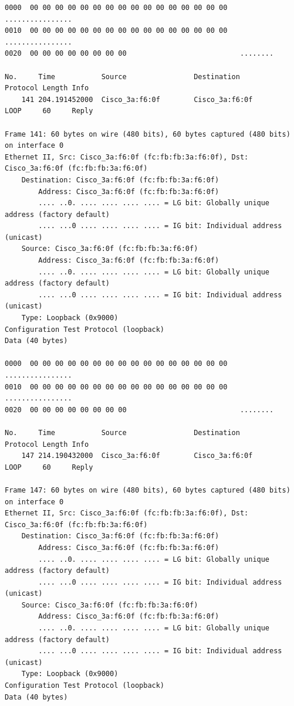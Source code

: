 \documentclass[a4paper,11pt]{article}
\begin{document}
\begin{lstlisting}
0000  00 00 00 00 00 00 00 00 00 00 00 00 00 00 00 00   ................
0010  00 00 00 00 00 00 00 00 00 00 00 00 00 00 00 00   ................
0020  00 00 00 00 00 00 00 00                           ........

No.     Time           Source                Destination           Protocol Length Info
    141 204.191452000  Cisco_3a:f6:0f        Cisco_3a:f6:0f        LOOP     60     Reply

Frame 141: 60 bytes on wire (480 bits), 60 bytes captured (480 bits) on interface 0
Ethernet II, Src: Cisco_3a:f6:0f (fc:fb:fb:3a:f6:0f), Dst: Cisco_3a:f6:0f (fc:fb:fb:3a:f6:0f)
    Destination: Cisco_3a:f6:0f (fc:fb:fb:3a:f6:0f)
        Address: Cisco_3a:f6:0f (fc:fb:fb:3a:f6:0f)
        .... ..0. .... .... .... .... = LG bit: Globally unique address (factory default)
        .... ...0 .... .... .... .... = IG bit: Individual address (unicast)
    Source: Cisco_3a:f6:0f (fc:fb:fb:3a:f6:0f)
        Address: Cisco_3a:f6:0f (fc:fb:fb:3a:f6:0f)
        .... ..0. .... .... .... .... = LG bit: Globally unique address (factory default)
        .... ...0 .... .... .... .... = IG bit: Individual address (unicast)
    Type: Loopback (0x9000)
Configuration Test Protocol (loopback)
Data (40 bytes)

0000  00 00 00 00 00 00 00 00 00 00 00 00 00 00 00 00   ................
0010  00 00 00 00 00 00 00 00 00 00 00 00 00 00 00 00   ................
0020  00 00 00 00 00 00 00 00                           ........

No.     Time           Source                Destination           Protocol Length Info
    147 214.190432000  Cisco_3a:f6:0f        Cisco_3a:f6:0f        LOOP     60     Reply

Frame 147: 60 bytes on wire (480 bits), 60 bytes captured (480 bits) on interface 0
Ethernet II, Src: Cisco_3a:f6:0f (fc:fb:fb:3a:f6:0f), Dst: Cisco_3a:f6:0f (fc:fb:fb:3a:f6:0f)
    Destination: Cisco_3a:f6:0f (fc:fb:fb:3a:f6:0f)
        Address: Cisco_3a:f6:0f (fc:fb:fb:3a:f6:0f)
        .... ..0. .... .... .... .... = LG bit: Globally unique address (factory default)
        .... ...0 .... .... .... .... = IG bit: Individual address (unicast)
    Source: Cisco_3a:f6:0f (fc:fb:fb:3a:f6:0f)
        Address: Cisco_3a:f6:0f (fc:fb:fb:3a:f6:0f)
        .... ..0. .... .... .... .... = LG bit: Globally unique address (factory default)
        .... ...0 .... .... .... .... = IG bit: Individual address (unicast)
    Type: Loopback (0x9000)
Configuration Test Protocol (loopback)
Data (40 bytes)


\end{lstlisting}
\end{document}
